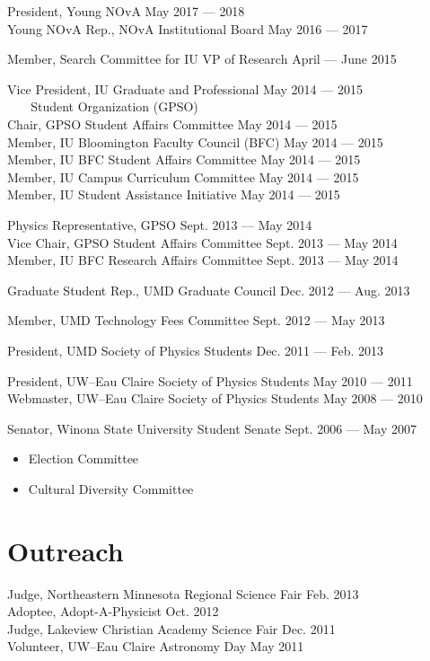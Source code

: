\documentclass[11pt]{cv}
\begin{document}
\begin{cv}
President, Young NOvA \hfill May 2017 --- 2018 \\
Young NOvA Rep., NOvA Institutional Board \hfill May 2016 --- 2017

Member, Search Committee for IU VP of Research \hfill April --- June 2015

Vice President, IU Graduate and Professional \hfill May 2014 --- 2015 \\
\verb!   ! Student Organization (GPSO) \\
Chair, GPSO Student Affairs Committee \hfill May 2014 --- 2015 \\
Member, IU Bloomington Faculty Council (BFC) \hfill May 2014 --- 2015 \\
Member, IU BFC Student Affairs Committee \hfill May 2014 --- 2015 \\
Member, IU Campus Curriculum Committee \hfill May 2014 --- 2015 \\
Member, IU Student Assistance Initiative \hfill May 2014 --- 2015

Physics Representative, GPSO \hfill Sept. 2013 --- May 2014 \\
Vice Chair, GPSO Student Affairs Committee \hfill Sept. 2013 --- May 2014 \\
Member, IU BFC Research Affairs Committee \hfill Sept. 2013 --- May 2014

Graduate Student Rep., UMD Graduate Council \hfill Dec. 2012 --- Aug. 2013

Member, UMD Technology Fees Committee \hfill Sept. 2012 --- May 2013

President, UMD Society of Physics Students \hfill Dec. 2011 --- Feb. 2013

President, UW--Eau Claire Society of Physics Students \hfill May 2010 --- 2011 \\
Webmaster, UW--Eau Claire Society of Physics Students \hfill May 2008 --- 2010

Senator, Winona State University Student Senate \hfill Sept. 2006 --- May 2007
\begin{itemize}
  \item Election Committee
  \item Cultural Diversity Committee
\end{itemize}


\section{Outreach}
Judge, Northeastern Minnesota Regional Science Fair \hfill Feb. 2013 \\
Adoptee, Adopt-A-Physicist \hfill Oct. 2012 \\
Judge, Lakeview Christian Academy Science Fair \hfill Dec. 2011 \\
Volunteer, UW--Eau Claire Astronomy Day \hfill May 2011



\end{cv}
\end{document}
